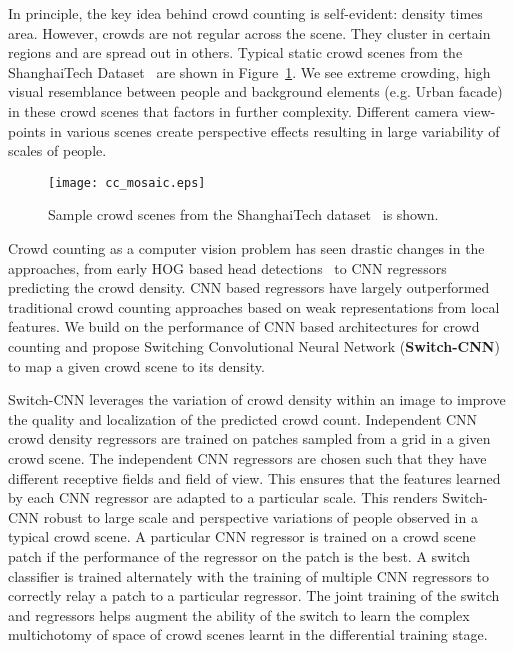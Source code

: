\documentclass[10pt,twocolumn,letterpaper]{article}
\begin{document}
In principle, the key idea behind crowd counting is self-evident: density times area. However, crowds are not regular across the scene. They cluster in certain regions and are spread out in others. Typical static crowd scenes from the ShanghaiTech Dataset~\cite{zhang2016single} are shown in  Figure~\ref{mosaic_cc}. We see extreme crowding, high visual resemblance between people and background elements (e.g. Urban facade) in these crowd scenes that factors in further complexity. Different camera view-points in various scenes create perspective effects resulting in large variability of scales of people.



\begin{figure}[!t]
 \texttt{[image: cc\_mosaic.eps]}\hspace{0.3cm}%
 \caption{Sample crowd scenes from the ShanghaiTech dataset~\cite{zhang2016single} is shown.}

\label{mosaic_cc}
\end{figure}
Crowd counting as a computer vision problem  has seen drastic changes in the approaches, from early HOG based head detections~\cite{idrees2013multi} to CNN regressors~\cite{zhang2015cross,zhang2016single,onoro2016towards} predicting the crowd density. CNN based regressors have largely outperformed traditional crowd counting approaches based on weak representations from local features. We build on the performance of CNN based architectures for crowd counting and propose Switching Convolutional Neural Network (\textbf{Switch-CNN}) to map a given crowd scene to its density. 

Switch-CNN leverages the variation of crowd density within an image to improve the quality and localization of the predicted crowd count. Independent CNN crowd density regressors are trained on patches sampled from a grid in a given crowd scene. The independent CNN regressors are chosen such that they have different receptive fields and field of view. This ensures that the features learned by each CNN regressor are adapted to a particular scale. This renders Switch-CNN robust to large scale and perspective variations of people observed in a typical crowd scene. A particular CNN regressor is trained on a crowd scene patch if the performance of the regressor on the patch is the best. A switch classifier is trained alternately with the training of multiple CNN regressors to correctly relay a patch to a particular regressor. The joint training of the switch and regressors helps augment the ability of the switch to learn the complex multichotomy of space of crowd scenes learnt in the differential training stage. 
\end{document}
